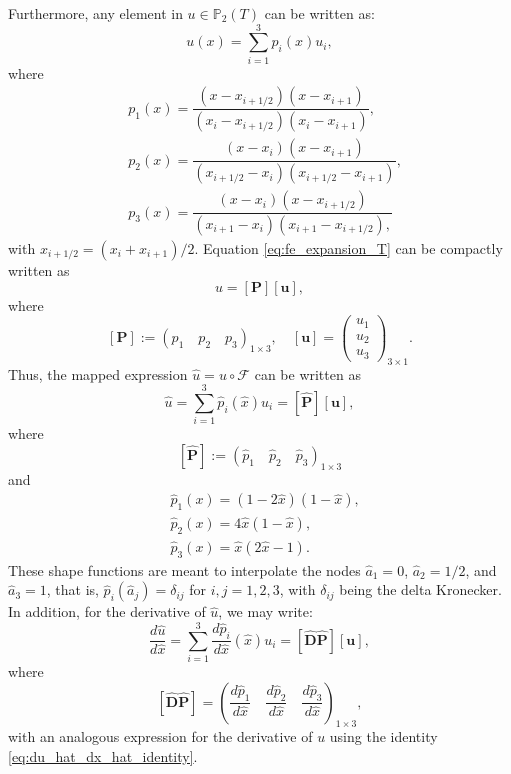 \documentclass{sfuthesis}
\numberwithin{equation}{section}
\numberwithin{figure}{chapter}
\numberwithin{table}{chapter}
\theoremstyle{definition}
\def\*#1{{\mathbf{#1}}} %
\newcommand{\der}[2]{\dfrac{d #1}{d #2}}
\begin{document}
Furthermore, any element in $u \in \mathbb{P}_2(T)$ can be written as:
\begin{equation} \label{eq:fe_expansion_T}
    u(x) = \sum_{i=1}^3 p_i(x)u_i,
\end{equation}
where
\begin{subequations} \label{eq:lagrange_basis_T}
    \begin{align}
        &p_1(x) = \dfrac{(x-x_{i+1/2})(x-x_{i+1})}{(x_i-x_{i+1/2})(x_i-x_{i+1})},\\
        &p_2(x) = \dfrac{(x-x_i)(x-x_{i+1})}{(x_{i+1/2}-x_i)(x_{i+1/2}-x_{i+1})}, \\
        &p_3(x) = \dfrac{(x-x_i)(x-x_{i+1/2})}{(x_{i+1}-x_i)(x_{i+1}-x_{i+1/2}),}
    \end{align}
\end{subequations}
with $x_{i+1/2} = (x_i+x_{i+1})/2$. Equation \eqref{eq:fe_expansion_T} can be compactly written as
\begin{equation}
    u = [\*P][\*u],
\end{equation}
where
\[
[\*P] := (p_1 \quad p_2 \quad p_3)_{1\times 3}, \quad [\*u] = \begin{pmatrix}
    u_1 \\ u_2 \\ u_3
\end{pmatrix}_{3 \times 1}.
\]
Thus, the mapped expression $\widehat{u} = u \circ \mathcal{F}$ can be written as
\begin{equation}
    \widehat{u} = \sum_{i=1}^3 \widehat{p}_i(\widehat{x}) u_i = [\widehat{\*P}][\*u],
\end{equation}
where
\[
[\widehat{\*P}] := (\widehat{p}_1 \quad \widehat{p}_2 \quad \widehat{p}_3)_{1\times 3}
\]
and
\begin{subequations}
    \begin{align}
        &\widehat{p}_1(x) = (1-2\widehat{x})(1-\widehat{x}), \\
        &\widehat{p}_2(x) = 4\widehat{x}(1-\widehat{x}), \\
        &\widehat{p}_3(x) = \widehat{x}(2\widehat{x}-1).
    \end{align}
\end{subequations}
These shape functions are meant to interpolate the nodes $\widehat{a}_1 = 0$, $\widehat{a}_2 = 1/2$, and $\widehat{a}_3 = 1$, that is, $\widehat{p}_i(\widehat{a}_j) = \delta_{ij}$ for $i,j=1,2,3$, with $\delta_{ij}$ being the delta Kronecker.  In addition, for the derivative of $\widehat{u}$, we may write:
\begin{equation}
    \der{\widehat{u}}{\widehat{x}} = \sum_{i=1}^3 \der{\widehat{p}_i}{\widehat{x}}(\widehat{x}) u_i = [\widehat{\*D} \widehat{\*P}] [\*u],
\end{equation}
where
\[
    [\widehat{\*D} \widehat{\*P}]  = \left(  \der{\widehat{p}_1}{\widehat{x}} \quad \der{\widehat{p}_2}{\widehat{x}} \quad \der{\widehat{p}_3}{\widehat{x}} \right)_{1 \times 3},
\]
with an analogous expression for the derivative of $u$ using the identity \eqref{eq:du_hat_dx_hat_identity}. 
\end{document}
